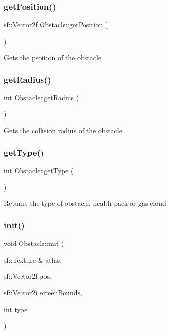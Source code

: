 \subsubsection{\texorpdfstring{get\+Position()}{getPosition()}}
{\footnotesize\ttfamily sf\+::\+Vector2f Obstacle\+::get\+Position (\begin{DoxyParamCaption}{ }\end{DoxyParamCaption})}

Gets the psoition of the obstacle \mbox{\label{class_obstacle_af618239790edb9fc94a984f8bb281c3e}} 
\subsubsection{\texorpdfstring{get\+Radius()}{getRadius()}}
{\footnotesize\ttfamily int Obstacle\+::get\+Radius (\begin{DoxyParamCaption}{ }\end{DoxyParamCaption})}

Gets the collision radius of the obstacle \mbox{\label{class_obstacle_ad28c6a458187a5f5ec68c8cc3c425114}} 
\subsubsection{\texorpdfstring{get\+Type()}{getType()}}
{\footnotesize\ttfamily int Obstacle\+::get\+Type (\begin{DoxyParamCaption}{ }\end{DoxyParamCaption})}

Returns the type of obstacle, health pack or gas cloud \mbox{\label{class_obstacle_a360ec5da9397222a1699c6c6cd8bd5c4}} 
\subsubsection{\texorpdfstring{init()}{init()}}
{\footnotesize\ttfamily void Obstacle\+::init (\begin{DoxyParamCaption}\item[{sf\+::\+Texture \&}]{atlas,  }\item[{sf\+::\+Vector2f}]{pos,  }\item[{sf\+::\+Vector2i}]{screen\+Bounds,  }\item[{int}]{type }\end{DoxyParamCaption})}

